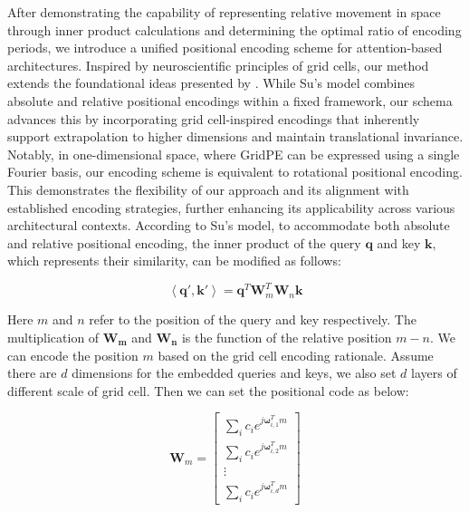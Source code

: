 \documentclass[letterpaper]{article} %
\begin{document}
After demonstrating the capability of representing relative movement in space through inner product calculations and determining the optimal ratio of encoding periods, we introduce a unified positional encoding scheme for attention-based architectures. Inspired by neuroscientific principles of grid cells, our method extends the foundational ideas presented by \cite{su2024roformer}. While Su’s model combines absolute and relative positional encodings within a fixed framework, our schema advances this by incorporating grid cell-inspired encodings that inherently support extrapolation to higher dimensions and maintain translational invariance. Notably, in one-dimensional space, where GridPE can be expressed using a single Fourier basis, our encoding scheme is equivalent to rotational positional encoding. This demonstrates the flexibility of our approach and its alignment with established encoding strategies, further enhancing its applicability across various architectural contexts. According to Su's model, to accommodate both absolute and relative positional encoding, the inner product of the query $\boldsymbol{q}$ and key $\boldsymbol{k}$, which represents their similarity, can be modified as follows:

\begin{equation}
\left\langle \boldsymbol{q}', \boldsymbol{k}' \right\rangle = \boldsymbol{q}^T \boldsymbol{W}_m^T \boldsymbol{W}_n \boldsymbol{k}
\end{equation}

Here $m$ and $n$ refer to the position of the query and key respectively. The multiplication of $\boldsymbol{W_m}$ and $\boldsymbol{W_n}$ is the function of the relative position $m-n$. We can encode the position $m$ based on the grid cell encoding rationale. Assume there are $d$ dimensions for the embedded queries and keys, we also set $d$ layers of different scale of grid cell. Then we can set the positional code as below: 

\begin{equation}
\label{eq13}
\boldsymbol{W}_m = \left[
\begin{array}{c}
\sum_{i} c_{i} e^{j \boldsymbol{\omega}_{i,1}^T m} \\
\sum_{i} c_{i} e^{j \boldsymbol{\omega}_{i,2}^T m} \\
\vdots \\
\sum_{i} c_{i} e^{j \boldsymbol{\omega}_{i,d}^T m}
\end{array}
\right]
\end{equation}
\end{document}
